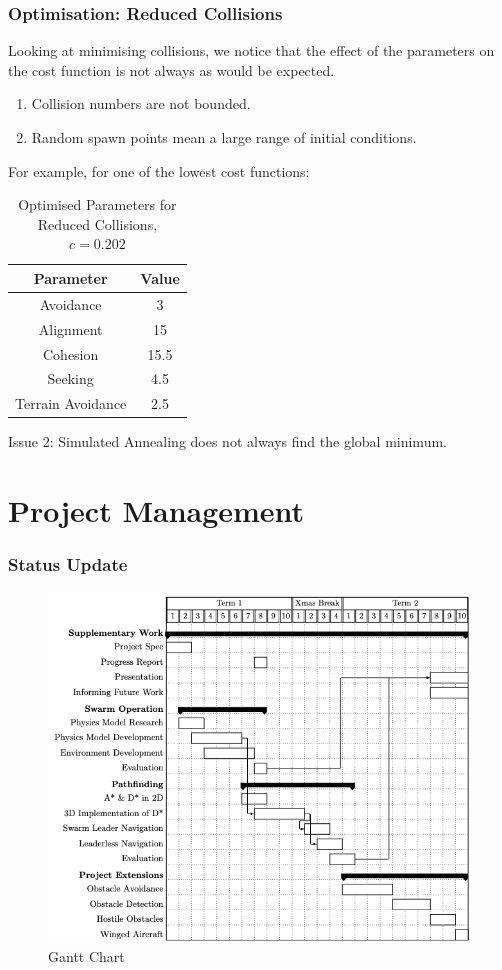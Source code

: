 \documentclass{beamer}
\begin{document}
\begin{frame}
    \frametitle{Optimisation: Reduced Collisions}
    Looking at minimising collisions, we notice that the effect of the parameters on the cost function is not always as would be expected.
    \begin{enumerate}
        \item Collision numbers are not bounded.
        \item Random spawn points mean a large range of initial conditions.
    \end{enumerate}
    For example, for one of the lowest cost functions:
    \begin{table}
        \begin{tabular}{|c|c|}
            \hline
            Parameter & Value \\
            \hline
            Avoidance & 3 \\
            Alignment & 15 \\
            Cohesion & 15.5 \\
            Seeking & 4.5 \\
            Terrain Avoidance & 2.5 \\
            \hline
        \end{tabular}
        \caption{Optimised Parameters for Reduced Collisions, $c = 0.202$}
    \end{table}
    Issue 2: Simulated Annealing does not always find the global minimum.
\end{frame}



\section{Project Management}
\begin{frame}
    \frametitle{Status Update}
    \begin{figure}
        \includegraphics[width=0.6\linewidth]{gantt}
        \caption{Gantt Chart}
    \end{figure}
\end{frame}
\end{document}
